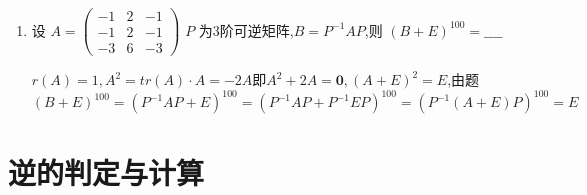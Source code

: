 \documentclass[12pt, a4paper, oneside, UTF8]{ctexbook}
\begin{document}
\begin{enumerate}
    \item 设
    $A = \begin{pmatrix}
    -1 & 2 & -1 \\
    -1 & 2 & -1 \\
    -3 & 6 & -3
    \end{pmatrix}$
    $ P $ 为3阶可逆矩阵,$ B = P^{-1}AP $,则 $ (B + E)^{100} =\_\_\_\_ $ 
    
    \begin{solution}
    $r(A)=1, A^2=tr(A)\cdot A=-2A$即$A^2+2A=\mathbf{0}, (A+E)^2=E$,由题 \\
    $(B+E)^{100}=(P^{-1}AP+E)^{100}=(P^{-1}AP+P^{-1}EP)^{100}=(P^{-1}(A+E)P)^{100}=E$
    \end{solution}
\end{enumerate}

\section{逆的判定与计算}
\end{document}
